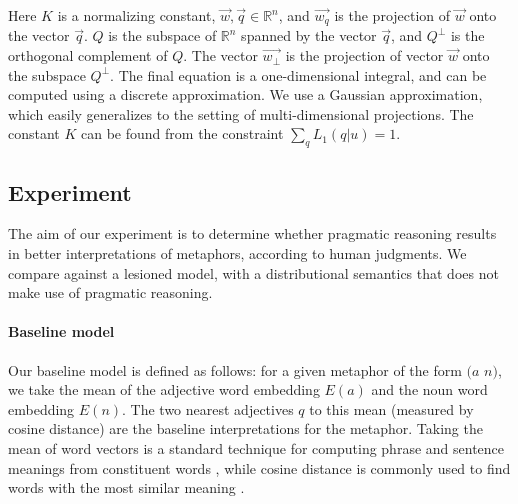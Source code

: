 \documentclass[9pt,twocolumn,twoside,lineno]{pnas-new}
\begin{document}
{	Here $K$ is a normalizing constant, $\overrightarrow{w}, \overrightarrow{q}\in \mathbb{R}^n$, and $\overrightarrow{w_q}$ is the projection of $\overrightarrow{w}$ onto the vector $\overrightarrow{q}$. $Q$ is the subspace of $\mathbb{R}^n$ spanned by the vector $\overrightarrow{q}$, and $Q^\bot$ is the orthogonal complement of $Q$. 
	The vector $\overrightarrow{w_\bot}$ is the projection of vector $\overrightarrow{w}$ onto the subspace $Q^\bot$. The final equation is a one-dimensional integral, and can be computed using a discrete approximation. We use a Gaussian approximation, which easily generalizes to the setting of multi-dimensional projections. The constant $K$ can be found from the constraint $\sum_q L_1(q|u) = 1$.




\subsection*{Experiment}

		The aim of our experiment is to determine whether pragmatic reasoning results in better interpretations of metaphors, according to human judgments. We compare against a lesioned model, with a distributional semantics that does not make use of pragmatic reasoning.

		\paragraph{Baseline model}
		Our baseline model is defined as follows: for a given metaphor of the form $(a$ $n)$, we take the mean of the adjective word embedding $E(a)$ and the noun word embedding $E(n)$. The two nearest adjectives $q$ to this mean (measured by cosine distance) are the baseline interpretations for the metaphor. Taking the mean of word vectors is a standard technique for computing phrase and sentence meanings from constituent words \cite{mitchell2010composition,grefenstette2013category,socher2013recursive}, while cosine distance is commonly used to find words with the most similar meaning \cite{pennington2014glove}.



			


}
\end{document}
